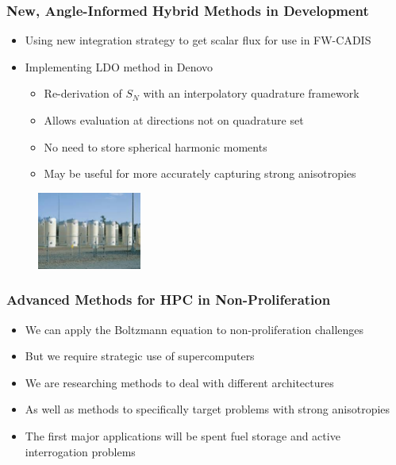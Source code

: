 \documentclass[xcolor=x11names,compress]{beamer}
\renewcommand{\(}{\begin{columns}}
\renewcommand{\)}{\end{columns}}
\newcommand{\<}[1]{\begin{column}{#1}}
\renewcommand{\>}{\end{column}}
\begin{document}
\begin{frame}[fragile]
  \frametitle{New, Angle-Informed Hybrid Methods in Development}

	\begin{itemize}
	\item Using new integration strategy to get scalar flux for use in 
	      FW-CADIS \cite{Peplow2012}
	\item Implementing LDO method \cite{Ahrens2014} in Denovo
	  \begin{itemize}
	  \item Re-derivation of $S_N$ with an interpolatory quadrature framework
	  \item Allows evaluation at directions not on quadrature set
	  \item No need to store spherical harmonic moments
	  \item May be useful for more accurately capturing strong anisotropies
	  \end{itemize}
	\end{itemize}
	
	\begin{center}
 	\begin{figure}
 	\includegraphics[height=1in,clip]{../figs/isfsi}
    \end{figure}
 	\end{center}

\end{frame}

\begin{frame}[fragile]
  \frametitle{Advanced Methods for HPC in Non-Proliferation}

	\begin{itemize}
	\item We can apply the Boltzmann equation to non-proliferation challenges
	\item But we require strategic use of supercomputers
	\item We are researching methods to deal with different architectures
	\item As well as methods to specifically target problems with strong anisotropies
	\item The first major applications will be spent fuel storage and active interrogation problems
	\end{itemize}

\end{frame}
\end{document}
